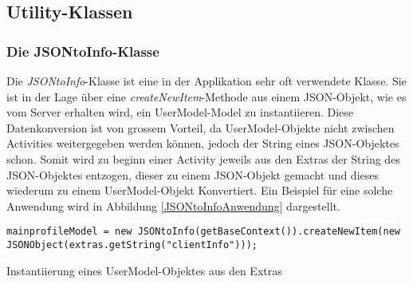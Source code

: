 \documentclass[../main.tex]{subfiles}
\begin{document}
	
	\subsection{Utility-Klassen}
	\subsubsection{Die JSONtoInfo-Klasse}
	Die \emph{JSONtoInfo}-Klasse ist eine in der Applikation sehr oft verwendete Klasse. Sie ist in der Lage über eine \emph{createNewItem}-Methode aus einem JSON-Objekt, wie es vom Server erhalten wird, ein UserModel-Model zu instantiieren. Diese Datenkonversion ist von grossem Vorteil, da UserModel-Objekte nicht zwischen Activities weitergegeben werden können, jedoch der String eines JSON-Objektes schon. Somit wird zu beginn einer Activity jeweils aus den Extras der String des JSON-Objektes entzogen, dieser zu einem JSON-Objekt gemacht und dieses wiederum zu einem UserModel-Objekt Konvertiert. Ein Beispiel für eine solche Anwendung wird in Abbildung \ref{JSONtoInfoAnwendung} dargestellt.
	
\begin{code}
	\begin{center}
		\begin{verbatim}
mainprofileModel = new JSONtoInfo(getBaseContext()).createNewItem(new JSONObject(extras.getString("clientInfo")));			
		\end{verbatim}
		\caption{Instantiierung eines UserModel-Objektes aus den Extras}
		\label{JSONtoInfoAnwendung}
	\end{center}
\end{code}
	
\end{document}
